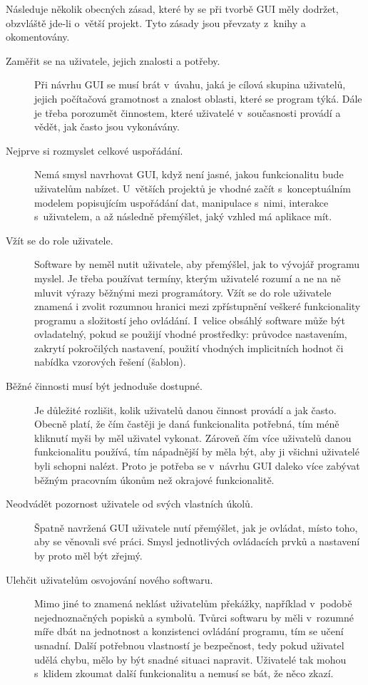 \documentclass[a4paper,12pt,draft]{article}
\begin{document}
Následuje několik obecných zásad, které by se při tvorbě GUI měly
dodržet, obzvláště jde-li o~větší projekt. Tyto zásady jsou převzaty
z~knihy \cite{bloopers} a okomentovány.
\begin{description}
    \item[Zaměřit se na uživatele, jejich znalosti a
    potřeby.] Při návrhu GUI se musí brát v~úvahu, jaká je cílová
    skupina uživatelů, jejich počítačová gramotnost a znalost oblasti,
    které se program týká. Dále je třeba porozumět činnostem,
    které uživatelé v~současnosti provádí a vědět, jak často jsou
    vykonávány.

\item [Nejprve si rozmyslet celkové uspořádání.]
Nemá smysl  navrhovat GUI, když není jasné, jakou funkcionalitu
bude uživatelům nabízet. U~větších projektů je vhodné začít
s~konceptuálním modelem popisujícím uspořádání dat, manipulace s~nimi,
interakce s~uživatelem, a až následně přemýšlet, jaký vzhled má
aplikace mít.

\item [Vžít se do role uživatele.] Software by neměl nutit uživatele,
aby přemýšlel, jak to vývojář programu myslel. Je třeba používat
termíny, kterým uživatelé rozumí a ne na ně mluvit výrazy běžnými
mezi programátory. Vžít se do role uživatele znamená i zvolit rozumnou
hranici mezi zpřístupnění veškeré funkcionality programu a složitostí
jeho ovládání. I~velice obsáhlý software může být ovladatelný,
pokud se použijí vhodné prostředky: průvodce nastavením, zakrytí
pokročilých nastavení, použití vhodných implicitních hodnot či
nabídka vzorových řešení (šablon).

\item [Běžné činnosti musí být jednoduše dostupné.]  Je důležité rozlišit,
 kolik uži\-vatelů danou činnost provádí a jak často. Obecně
platí, že čím častěji je daná funkcionalita potřebná, tím méně
kliknutí myši by měl uživatel vykonat. Zároveň čím více uživatelů
danou funkcionalitu používá, tím nápadnější  by měla být, aby
ji všichni uživatelé byli schopni nalézt. Proto je potřeba se v~návrhu GUI  daleko
více zabývat běžným pracovním úkonům než okrajové funkcionalitě.

\item [Neodvádět pozornost uživatele od svých vlastních úkolů.] Špatně
navržená GUI uživatele nutí přemýšlet, jak je ovládat,
místo toho, aby se věnovali své práci. Smysl jednotlivých ovládacích
prvků a nastavení by proto měl být zřejmý.

\item [Ulehčit uživatelům osvojování nového softwaru.] Mimo jiné to znamená
ne\-klást uživatelům překážky, například v~podobě nejednoznačných popisků
a symbolů. Tvůrci softwaru by měli v~rozumné míře dbát na jednotnost
a konzistenci ovládání programu, tím se učení usnadní. Další
potřebnou vlastností je bezpečnost, tedy pokud uživatel udělá chybu,
mělo by být snadné situaci napravit. Uživatelé tak mohou s~klidem
zkoumat další funkcionalitu a nemusí se bát, že něco zkazí.


\end{description}
\end{document}
